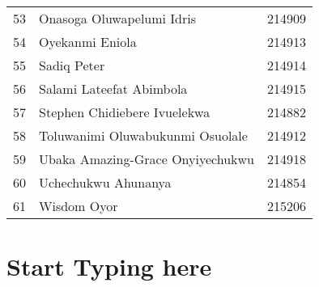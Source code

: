 \documentclass[a4paper]{article}
\begin{document}
\begin{center}
\begin{longtable} { c|l|c }
            53 & Onasoga Oluwapelumi Idris & 214909\\
            54 & Oyekanmi Eniola & 214913\\
            55 & Sadiq Peter & 214914\\
            56 & Salami Lateefat Abimbola & 214915\\
            57 & Stephen Chidiebere Ivuelekwa & 214882\\
            58 & Toluwanimi Oluwabukunmi Osuolale & 214912\\
            59 & Ubaka Amazing-Grace Onyiyechukwu & 214918\\
            60 & Uchechukwu Ahunanya & 214854\\
            61 & Wisdom Oyor & 215206\\
            \bottomrule[4pt]
        \end{longtable}
        \normalsize
    \end{center}

    \newpage
    \section{Start Typing here}
\end{document}
